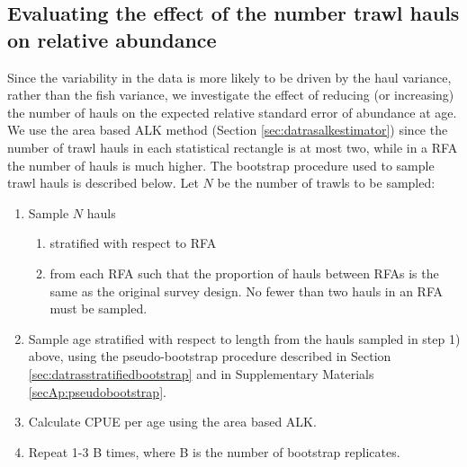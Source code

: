 \documentclass[a4paper 12pt]{article}
\numberwithin{equation}{section}
\begin{document}
\subsection{Evaluating the effect of the number trawl hauls on relative abundance}
\label{sec:evaluatingtrawlhauls}
Since the variability in the data is more likely to be driven by the haul variance, rather than the fish variance, we investigate the effect of reducing (or increasing) the number of hauls on the expected relative standard error of abundance at age. We use the area based ALK method (Section \ref{sec:datrasalkestimator}) since the number of trawl hauls in each statistical rectangle is at most two, while in a RFA the number of hauls is much higher. The bootstrap procedure used to sample trawl hauls is described below. Let $N$ be the number of trawls to be sampled:
\begin{enumerate}
\item Sample $N$ hauls
     \begin{enumerate}
      \item stratified with respect to RFA
      \item from each RFA such that the proportion of hauls between RFAs is the same as the original survey design. No fewer than two hauls in an RFA must be sampled.
      \end{enumerate} 
\item Sample age stratified with respect to length from the hauls sampled in step 1) above, using the pseudo-bootstrap procedure described in Section \ref{sec:datrasstratifiedbootstrap} and in Supplementary Materials \ref{secAp:pseudobootstrap}.
\item Calculate CPUE per age using the area based ALK.
\item Repeat 1-3 B times, where B is the number of bootstrap replicates.
\end{enumerate}
\end{document}
